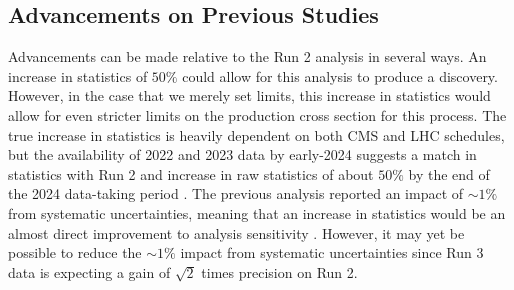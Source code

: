 \documentclass[12pt]{article}
\begin{document}
\subsection{Advancements on Previous Studies}
Advancements can be made relative to the Run 2 analysis in several ways. An increase in statistics of $50\%$ could allow for this analysis to produce a discovery. However, in the case that we merely set limits, this increase in statistics would allow for even stricter limits on the production cross section for this process. The true increase in statistics is heavily dependent on both CMS and LHC schedules, but the availability of 2022 and 2023 data by early-2024 suggests a match in statistics with Run 2 and increase in raw statistics of about $50\%$ by the end of the 2024 data-taking period \cite{PC_CMS_Week}. The previous analysis reported an impact of ${\sim}1\%$ from systematic uncertainties, meaning that an increase in statistics would be an almost direct improvement to analysis sensitivity \cite{Run2_analysis}. However, it may yet be possible to reduce the ${\sim}1\%$ impact from systematic uncertainties since Run 3 data is expecting a gain of $\sqrt{2}$ times precision on Run 2.\par

\end{document}
